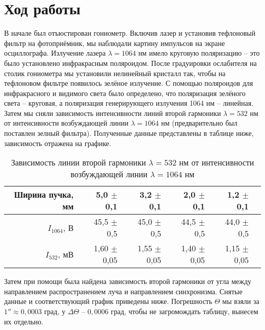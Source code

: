 \section*{Ход работы}
В начале был отъюстирован гониометр. Включив лазер и установив тефлоновый фильтр на фотоприёмник, мы наблюдали картину импульсов на экране осциллографа. Излучение лазера $\lambda = 1064$ нм имело круговую поляризацию -- это было установлено инфракрасным поляроидом.
\n\n
После градуировки ослабителя на столик гониометра мы установили нелинейный кристалл так, чтобы на тефлоновом фильтре появилось зелёное излучение. С помощью поляроидов для инфракрасного и видимого света было определено, что поляризация зелёного света -- круговая, а поляризация генерирующего излучения 1064 нм -- линейная.
\n\n
Затем мы сняли зависимость интенсивности линий второй гармоники $\lambda = 532$ нм от интенсивности возбуждающей линии $\lambda = 1064$ нм (предварительно был поставлен зелный фильтра). Полученные данные представлены в таблице ниже, зависимость отражена на графике.
\begin{table}[H]
\centering
\begin{tabular}{|r||r|r|r|r|r|}
\hline 
Ширина пучка, мм & 5,0 $\pm$ 0,1  & 3,2 $\pm$ 0,1  & 2,0 $\pm$ 0,1 & 1,2 $\pm$ 0,1 \\ \hline
$I_{1064}$, В & 45,5 $\pm$ 0,5 & 45,0 $\pm$ 0,5  & 44,5 $\pm$ 0,5 & 44,0 $\pm$ 0,5   \\ \hline
$I_{532}$, мВ & 1,60 $\pm$ 0,05  & 1,55 $\pm$ 0,05 & 1,40 $\pm$ 0,05  & 1,15 $\pm$ 0,05 	\\ \hline
\end{tabular}
\caption{Зависимость линии второй гармоники $\lambda = 532$ нм от интенсивности возбуждающей линии $\lambda = 1064 $ нм}
\end{table}

\n
Затем при помощи была найдена зависимость второй гармоники от угла между направлением распространением луча и направлением синхронизма. Снятые данные и соответствующий график приведены ниже. Погрешность $\Theta$ мы взяли за $1'' \approx 0,0003$ град, у $\Delta \Theta$ -- $0,0006$ град, чтобы не загромождать таблицу, вынесем их отдельно.

